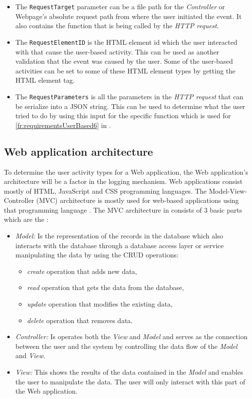 \begin{itemize}
	\item The \texttt{RequestTarget} parameter can be a file path for the \textit{Controller} or Webpage's absolute request path from where the user initiated the event. It also contains the function that is being called by the \textit{HTTP request}.
	\item The \texttt{RequestElementID} is the HTML element id which the user interacted with that cause the user-based activity. This can be used as another validation that the event was caused by the user. Some of the user-based activities can be set to some of these HTML element types by getting the HTML element tag.
	\item The \texttt{RequestParameters} is all the parameters in the \textit{HTTP request} that can be serialize into a JSON string. This can be used to determine what the user tried to do by using this input for the specific function which is used for \ref{fr:requirementsUserBased6} in .
\end{itemize}

\subsection{Web application architecture}\label{sec:ch2_webApplicationArchitecture}
To determine the user activity types for a Web application, the Web application's architecture will be a factor in the logging mechanism. Web applications consist mostly of HTML, JavaScript and CSS programming languages. The Model-View-Controller (MVC) architecture is mostly used for web-based applications using that programming language \cite{Jailia2016}. The MVC architecture in  consists of 3 basic parts which are the \cite{Jailia2016}:

\begin{itemize}
	\item \textit{Model:} Is the representation of the records in the database which also interacts with the database through a database access layer or service manipulating the data by using the CRUD operations:
	\begin{itemize}
		\item \textit{create} operation that adds new data,
		\item \textit{read} operation that gets the data from the database,
		\item \textit{update} operation that modifies the existing data,
		\item \textit{delete} operation that removes data.
	\end{itemize}
	\item \textit{Controller:} Is operates both the \textit{View} and \textit{Model} and serves as the connection between the user and the system by controlling the data flow of the \textit{Model} and
	\textit{View}.
	\item \textit{View:} This shows the results of the data contained in the \textit{Model} and enables the user to manipulate the data. The user will only interact with this part of the Web application.
\end{itemize}

